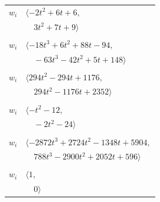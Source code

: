\documentclass[11pt]{article}
\begin{document}
\begin{longtable}{@{}ll@{}}
$w_i$ & $\langle -2t^{2}+6t+6,$\\
 & $\quad 3t^{2}+7t+9\rangle$\\
\addlinespace[2pt]
\multicolumn{2}{@{}p{0.97\textwidth}@{}}{$i=3$, $D_i=1$, $\rho_{ij}$: $8{:}2, \allowbreak 18{:}1, \allowbreak 19{:}2, \allowbreak 20{:}2, \allowbreak 23{:}2, \allowbreak 29{:}2, \allowbreak 36{:}1, \allowbreak 37{:}2, \allowbreak 62{:}1, \allowbreak 67{:}1, \allowbreak 74{:}1, \allowbreak 77{:}1, \allowbreak 81{:}1, \allowbreak 96{:}2$}\\
$w_i$ & $\langle -18t^{3}+6t^{2}+88t-94,$\\
 & $\quad -63t^{3}-42t^{2}+5t+148\rangle$\\
\addlinespace[2pt]
\multicolumn{2}{@{}p{0.97\textwidth}@{}}{$i=4$, $D_i=1$, $\rho_{ij}$: $16{:}1, \allowbreak 17{:}2, \allowbreak 26{:}1, \allowbreak 27{:}2, \allowbreak 32{:}2, \allowbreak 39{:}1, \allowbreak 40{:}2, \allowbreak 47{:}2, \allowbreak 50{:}1, \allowbreak 51{:}2, \allowbreak 59{:}1, \allowbreak 64{:}2, \allowbreak 82{:}1, \allowbreak 89{:}1, \allowbreak 95{:}2, \allowbreak 97{:}1$}\\
$w_i$ & $\langle 294t^{2}-294t+1176,$\\
 & $\quad 294t^{2}-1176t+2352\rangle$\\
\addlinespace[2pt]
\multicolumn{2}{@{}p{0.97\textwidth}@{}}{$i=5$, $D_i=1$, $\rho_{ij}$: $8{:}1, \allowbreak 10{:}1, \allowbreak 47{:}1, \allowbreak 64{:}2, \allowbreak 67{:}2, \allowbreak 69{:}2, \allowbreak 89{:}2, \allowbreak 97{:}1$}\\
$w_i$ & $\langle -t^{2}-12,$\\
 & $\quad -2t^{2}-24\rangle$\\
\addlinespace[2pt]
\multicolumn{2}{@{}p{0.97\textwidth}@{}}{$i=6$, $D_i=1$, $\rho_{ij}$: $0{:}2, \allowbreak 8{:}2, \allowbreak 13{:}2, \allowbreak 16{:}2, \allowbreak 17{:}2, \allowbreak 21{:}2, \allowbreak 26{:}2, \allowbreak 32{:}1, \allowbreak 33{:}2, \allowbreak 36{:}2, \allowbreak 40{:}2, \allowbreak 55{:}1, \allowbreak 57{:}2, \allowbreak 60{:}2, \allowbreak 62{:}1, \allowbreak 63{:}2$}\\
$w_i$ & $\langle -2872t^{3}+2724t^{2}-1348t+5904,$\\
 & $\quad 788t^{3}-2900t^{2}+2052t+596\rangle$\\
\addlinespace[2pt]
\multicolumn{2}{@{}p{0.97\textwidth}@{}}{$i=7$, $D_i=1$, $\rho_{ij}$: $--$}\\
$w_i$ & $\langle 1,$\\
 & $\quad 0\rangle$\\

\end{longtable}
\end{document}
